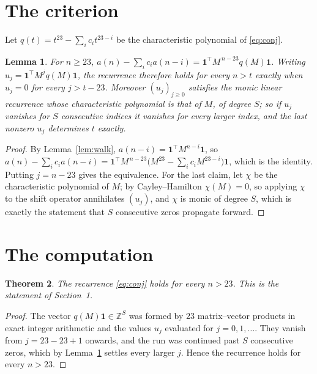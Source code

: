 \documentclass[11pt,a4paper]{article}
\theoremstyle{plain}
\newtheorem{theorem}{Theorem}
\newtheorem{lemma}[theorem]{Lemma}
\theoremstyle{definition}
\begin{document}
\section{The criterion}

Let $q(t)=t^{23}-\sum_i c_i t^{23-i}$ be the characteristic polynomial of
\eqref{eq:conj}.

\begin{lemma}\label{lem:crit}
For $n\ge23$,
$a(n)-\sum_i c_i a(n-i)=\mathbf{1}^{\!\top}M^{\,n-23}q(M)\mathbf{1}$. Writing
$u_j=\mathbf{1}^{\!\top}M^{j}q(M)\mathbf{1}$, the recurrence therefore holds for every
$n>t$ exactly when $u_j=0$ for every $j>t-23$. Moreover $(u_j)_{j\ge0}$ satisfies the
monic linear recurrence whose characteristic polynomial is that of $M$, of degree $S$; so
if $u_j$ vanishes for $S$ consecutive indices it vanishes for every larger index, and the
last nonzero $u_j$ determines $t$ exactly.
\end{lemma}

\begin{proof}
By Lemma~\ref{lem:walk}, $a(n-i)=\mathbf{1}^{\!\top}M^{n-i}\mathbf{1}$, so
$a(n)-\sum_i c_i a(n-i)
=\mathbf{1}^{\!\top}M^{\,n-23}\bigl(M^{23}-\sum_i c_i M^{23-i}\bigr)
\mathbf{1}$, which is the identity. Putting $j=n-23$ gives the equivalence. For the
last claim, let $\chi$ be the characteristic polynomial of $M$; by Cayley--Hamilton
$\chi(M)=0$, so applying $\chi$ to the shift operator annihilates $(u_j)$, and $\chi$ is
monic of degree $S$, which is exactly the statement that $S$ consecutive zeros propagate
forward.
\end{proof}

\section{The computation}

\begin{theorem}
The recurrence \eqref{eq:conj} holds for every $n>23$. This is the statement of
Section~1.
\end{theorem}

\begin{proof}
The vector $q(M)\mathbf{1}\in\mathbb{Z}^{S}$ was formed by $23$ matrix--vector
products in exact integer arithmetic and the values $u_j$ evaluated for
$j=0,1,\dots$. They vanish from $j=23-23+1$ onwards, and the run was continued past
$S$ consecutive zeros, which by Lemma~\ref{lem:crit} settles every larger $j$. Hence the
recurrence holds for every $n>23$.
\end{proof}
\end{document}
